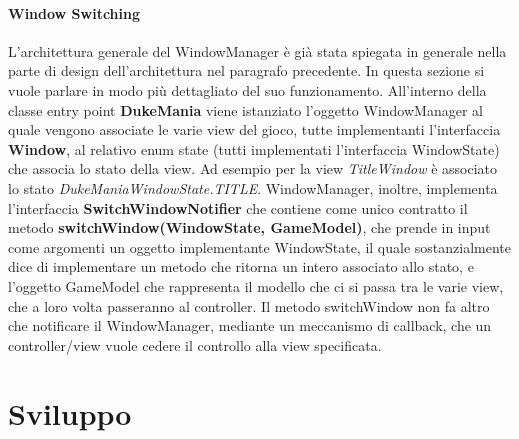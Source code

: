 \documentclass[a4paper,12pt]{report}
\begin{document}
\subsubsection{Window Switching}
L'architettura generale del WindowManager è già stata spiegata in generale nella parte di design dell'architettura nel paragrafo precedente.
In questa sezione si vuole parlare in modo più dettagliato del suo funzionamento.
All'interno della classe entry point \textbf{DukeMania} viene istanziato l'oggetto WindowManager al quale vengono associate le varie view del gioco, tutte implementanti l'interfaccia \textbf{Window},
al relativo enum state (tutti implementati l'interfaccia WindowState) che associa lo stato della view. Ad esempio per la view \emph{TitleWindow} è associato lo stato \emph{DukeManiaWindowState.TITLE}.
WindowManager, inoltre, implementa l'interfaccia \textbf{SwitchWindowNotifier} che contiene come unico contratto il metodo \textbf{switchWindow(WindowState, GameModel)}, che prende in input come 
argomenti un oggetto implementante WindowState, il quale sostanzialmente dice di implementare un metodo che ritorna un intero associato allo stato, e l'oggetto GameModel che rappresenta il
modello che ci si passa tra le varie view, che a loro volta passeranno al controller.
Il metodo switchWindow non fa altro che notificare il WindowManager, mediante un meccanismo di callback, che un controller/view vuole cedere il controllo alla view specificata.
\newpage



\chapter{Sviluppo}
\end{document}
